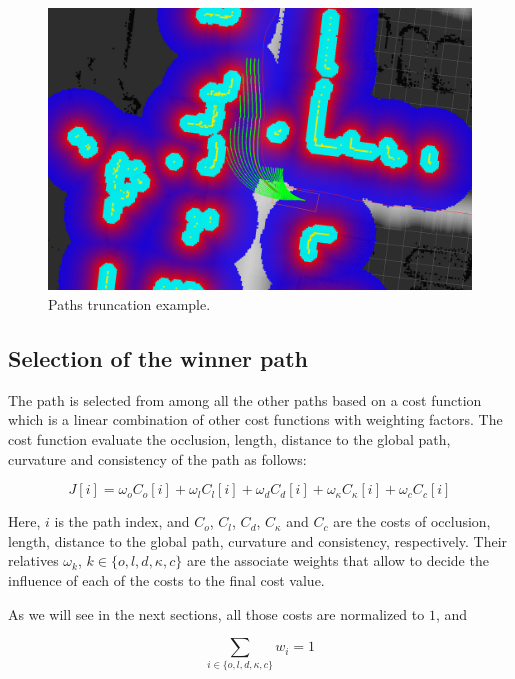\begin{figure}[h!]
\centering
\includegraphics{example15}
\caption{Paths truncation example.}\label{fig:cp07_path_truncation}
\end{figure}

\subsection{Selection of the winner path}\label{ch:chapter07_01_04}

The path is selected from among all the other paths based on a cost function which is a linear combination of other cost functions with weighting factors. The cost function evaluate the occlusion, length, distance to the global path, curvature and consistency of the path as follows:

\begin{equation}\label{eq:cp07_cost_function}
J[i] = \omega_o C_o[i] + \omega_l C_l[i] + \omega_d C_d[i] + \omega_{\kappa} C_{\kappa}[i] + \omega_c C_c[i]
\end{equation}

Here, $i$ is the path index, and $C_o$, $C_l$, $C_d$, $C_{\kappa}$ and $C_c$ are the costs of occlusion, length, distance to the global path, curvature and consistency, respectively. Their relatives $\omega_k$, $k \in \{o, l, d, \kappa, c\}$ are the associate weights that allow to decide the influence of each of the costs to the final cost value.

As we will see in the next sections, all those costs are normalized to $1$, and 

\begin{equation}\label{eq:cp07_weights_sum}
\sum_{{i \in \{o, l, d, \kappa, c\}}} w_i= 1
\end{equation}

